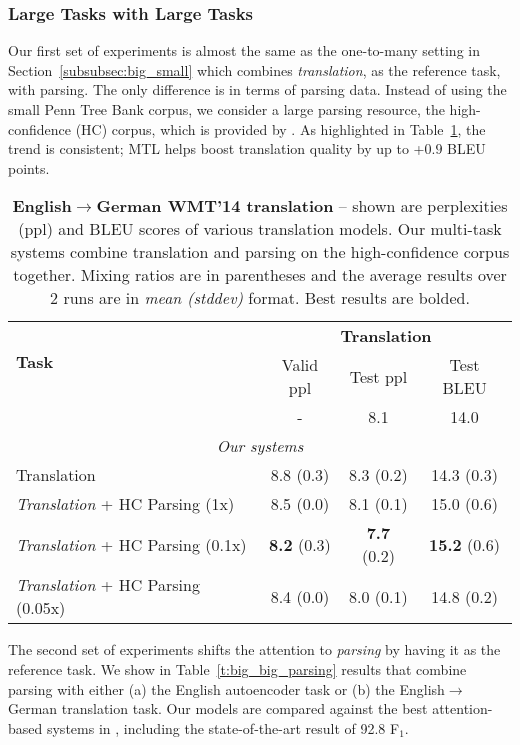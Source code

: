 \subsubsection{Large Tasks with Large Tasks}
\label{subsub:ll}
Our first set of experiments is almost the same as the one-to-many setting in
Section~\ref{subsubsec:big_small} which combines {\it translation}, as the reference
task, with parsing. The only difference is in terms of parsing data. Instead of using the
small Penn Tree Bank corpus, we consider a large parsing resource, the
high-confidence (HC) corpus, which is provided by \citet{vinyals15grammar}.
As highlighted in Table~\ref{t:big_big_translation}, the
trend is consistent; MTL helps boost translation quality by up
to +$0.9$ BLEU points. 

\begin{table}[tbh!]
\centering
\begin{tabular}{l|c|c|c}
\multirow{ 2}{*}{\bf{Task}} & \multicolumn{3}{c}{{\bf Translation}}\\
  \cline{2-4}
  & Valid ppl & Test ppl & Test BLEU\\
  \hline
\citep{luong15attn} & - & 8.1 & 14.0 \\
  \hline
\multicolumn{4}{c}{{\it Our systems}} \\
  \hline
Translation & 8.8 (0.3) & 8.3 (0.2) & 14.3 (0.3)\\
  \hline
{\it Translation} + HC Parsing (1x) &  8.5 (0.0) & 8.1 (0.1) & 15.0 (0.6) \\
{\it Translation} + HC Parsing (0.1x) &  {\bf 8.2} (0.3) & {\bf 7.7} (0.2) &
{\bf 15.2} (0.6)\\
{\it Translation} + HC Parsing (0.05x) &  8.4 (0.0) & 8.0 (0.1) & 14.8 (0.2) \\
\end{tabular}
\caption{{\bf English$\rightarrow$German WMT'14 translation} -- shown are
perplexities (ppl) and BLEU scores of various translation models. Our
multi-task systems combine translation and parsing on the
high-confidence corpus together. Mixing
ratios are in parentheses and the average results over 2 runs are in {\it
mean (stddev)} format. Best results are bolded.}
\label{t:big_big_translation}
\end{table}

The second set of experiments shifts the attention to {\it parsing} by having it as the reference task. 
We show in Table~\ref{t:big_big_parsing} results that combine parsing with
either (a) the English autoencoder task or (b) the English$\rightarrow$German
translation task. Our models are compared against the best attention-based systems in
\citep{vinyals15grammar}, including the state-of-the-art result of 92.8 F$_1$.

